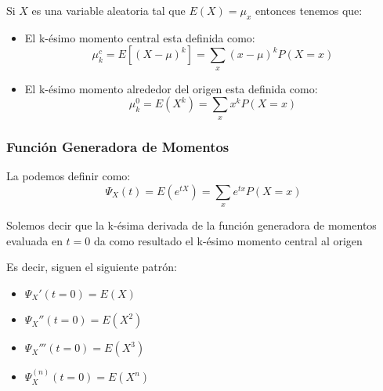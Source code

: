 \documentclass[12pt, fleqn]{report}                             %
\theoremstyle{break}                                            %
\newcommand{\Brackets}[1]{\left[ #1 \right]}                    %
\newcommand{\Wrap}[1]{\left( #1 \right)}                        %
\begin{document}
                Si $X$ es una variable aleatoria tal que $E(X) = \mu_x$ entonces tenemos que:
                \begin{itemize}
                    \item 
                        El k-ésimo momento central esta definida como:
                        \begin{equation}
                            \mu_k^c 
                                = E\Brackets{(X - \mu)^k}
                                = \sum_x (x - \mu)^k P(X = x)
                        \end{equation}

                    \item 
                        El k-ésimo momento alrededor del origen esta definida como:
                        \begin{equation}
                            \mu_k^0 
                                = E\Wrap{X^k}
                                = \sum_x x^k P(X = x)
                        \end{equation}

                \end{itemize}






                \clearpage
                \subsubsection{Función Generadora de Momentos}

                    La podemos definir como:
                    \begin{equation*}
                        \Psi_X (t) 
                            = E(e^{tX})
                            = \sum_x e^{tx} P(X = x)
                    \end{equation*}

                    Solemos decir que la k-ésima derivada de la función generadora
                    de momentos evaluada en $t = 0$ da como resultado el k-ésimo momento central al origen

                    Es decir, siguen el siguiente patrón:
                    \begin{itemize}
                        \item $\Psi_X' (t = 0) = E(X)$ 
                        \item $\Psi_X'' (t = 0) = E(X^2)$ 
                        \item $\Psi_X''' (t = 0) = E(X^3)$ 
                        \item $\Psi_X^{(n)} (t = 0) = E(X^n)$ 
                    \end{itemize}
\end{document}
